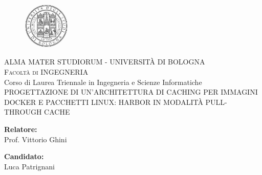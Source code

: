 \begin{titlepage}
    \begin{figure}[t]
        \centering\includegraphics[width=0.2\textwidth]{images/unibo.jpg}
    \end{figure}
    \begin{center}
        \textsc{ \LARGE{ALMA MATER STUDIORUM - UNIVERSITÀ DI BOLOGNA\\}}
        \textsc{ \Large{Facoltà di INGEGNERIA\\ }}
        \textnormal{ \LARGE{Corso di Laurea Triennale in Ingegneria e Scienze Informatiche\\}}
        \vspace{8mm}
        \fontsize{8mm}{7mm}\selectfont 
        \textup{PROGETTAZIONE DI UN'ARCHITETTURA DI CACHING PER IMMAGINI DOCKER E PACCHETTI LINUX: HARBOR IN MODALITÀ PULL-THROUGH CACHE}\\
    \end{center}
    
    \vspace{8mm}
    
    \begin{minipage}[t]{0.47\textwidth}
        \textnormal{\large{\bf Relatore:\\}}
        {\large Prof. Vittorio Ghini\\}
    \end{minipage}\hfill\begin{minipage}[t]{0.47\textwidth}\raggedleft
        \textnormal{\large{\bf Candidato:\\}}
        {\large Luca Patrignani\\}
    \end{minipage}
    
    
    
    
    \end{titlepage}